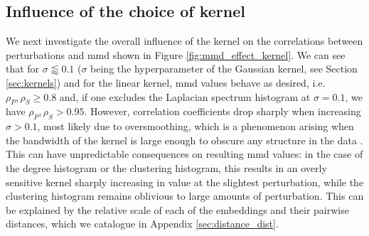\subsection{Influence of the choice of kernel}

We next investigate the overall influence of the kernel on the correlations
between perturbations and \gls{mmd} shown in Figure
\ref{fig:mmd_effect_kernel}. We can see that for $\sigma\lessapprox 0.1$
($\sigma$ being the hyperparameter of the Gaussian kernel, see Section
\ref{sec:kernels}) and for the linear kernel, \gls{mmd} values behave as
desired, i.e. $\rho_P, \rho_S\geq 0.8$ and, if one excludes the Laplacian
spectrum histogram at $\sigma=0.1$, we have $\rho_P,\rho_S>0.95$. However,
correlation coefficients drop sharply when increasing $\sigma>0.1$, most likely
due to oversmoothing, which is a phenomenon arising when the bandwidth of the
kernel is large enough to obscure any structure in the data
\citep{hwang1994nonparametric}. This can have unpredictable consequences on
resulting \gls{mmd} values: in the case of the degree histogram or the clustering
histogram, this results in an overly sensitive kernel sharply increasing in
value at the slightest perturbation, while the clustering histogram remains
oblivious to large amounts of perturbation. This can be explained by the
relative scale of each of the embeddings and their pairwise distances, which we
catalogue in Appendix \ref{sec:distance_dist}. %

